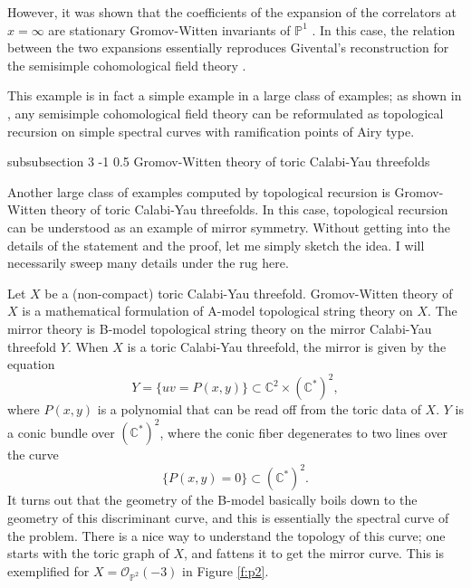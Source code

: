 \documentclass[reqno,oneside,11pt]{amsart}
\makeatletter
\theoremstyle{plain}
\theoremstyle{definition}
\theoremstyle{remark}
\numberwithin{equation}{section}
\renewcommand{\subsubsection}{\@startsection
{subsubsection}%
{3}%
{\z@}%
{-1\baselineskip}%
{0.5\baselineskip}%
{\normalfont \it \normalsize}} %
\makeatother
\begin{document}
However, it was shown that the coefficients of the expansion of the correlators at $x = \infty$ are stationary Gromov-Witten invariants of $\mathbb{P}^1$ \cite{NS11,DOSS12}. In this case, the relation between the two expansions essentially reproduces Givental's reconstruction for the semisimple cohomological field theory \cite{DOSS12}. 

This example is in fact a simple example in a large class of examples; as shown in \cite{DOSS12}, any semisimple cohomological field theory can be reformulated as topological recursion on simple spectral curves with ramification points of Airy type.

\subsubsection{ Gromov-Witten theory of toric Calabi-Yau threefolds}

Another large class of examples computed by topological recursion is Gromov-Witten theory of toric Calabi-Yau threefolds. In this case, topological recursion can be understood as an example of mirror symmetry. Without getting into the details of the statement and the proof, let me simply sketch the idea. I will necessarily sweep many details under the rug here.

 Let $X$ be a (non-compact) toric Calabi-Yau threefold. Gromov-Witten theory of $X$ is a mathematical formulation of A-model topological string theory on $X$. The mirror theory is B-model topological string theory on the mirror Calabi-Yau threefold $Y$. When $X$ is a toric Calabi-Yau threefold, the mirror is given by the equation
\begin{equation}
Y = \{ u v = P(x,y) \} \subset \mathbb{C}^2 \times (\mathbb{C}^*)^2,
\end{equation}
where $P(x,y)$ is a polynomial that can be read off from the toric data of $X$. $Y$ is a conic bundle over $(\mathbb{C}^*)^2$, where the conic fiber degenerates  to two lines over the curve
\begin{equation}
\{ P(x,y) = 0 \} \subset (\mathbb{C}^*)^2.
\end{equation}
It turns out that the geometry of the B-model basically boils down to the geometry of this discriminant curve, and this  is essentially the spectral curve of the problem. There is a nice way to understand the topology of this curve; one starts with the toric graph of $X$, and fattens it to get the mirror curve. This is exemplified for $X = \mathcal{O}_{\mathbb{P}^2}(-3) $ in Figure \ref{f:p2}.
\end{document}
